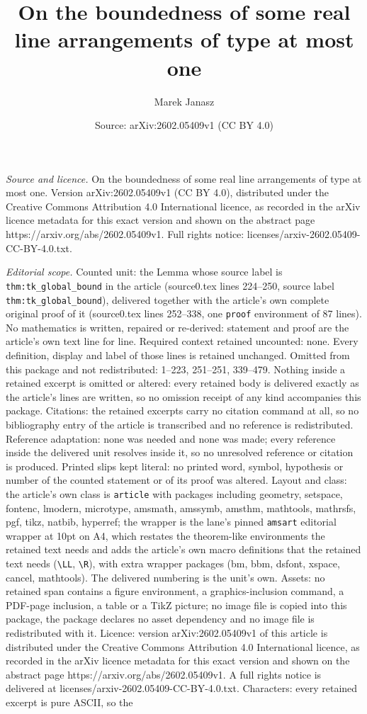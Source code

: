 \documentclass[10pt,a4paper]{amsart}
\title[On the boundedness of some real line arrangements of type at]{On the boundedness of some real line arrangements of type at most one}
\author{Marek Janasz}
\date{Source: arXiv:2602.05409v1 (CC BY 4.0)}
\begin{document}
\maketitle

\noindent\emph{Source and licence.} On the boundedness of some real line arrangements of type at most one. Version arXiv:2602.05409v1 (CC BY 4.0), distributed under the Creative Commons Attribution 4.0 International licence, as recorded in the arXiv licence metadata for this exact version and shown on the abstract page https://arxiv.org/abs/2602.05409v1. Full rights notice: licenses/arxiv-2602.05409-CC-BY-4.0.txt.\par\smallskip

\noindent\textit{Editorial scope.} Counted unit: the Lemma whose source label is \texttt{thm:tk\_global\_bound} in the article (source0.tex lines 224--250, source label \texttt{thm:tk\_global\_bound}), delivered together with the article's own complete original proof of it (source0.tex lines 252--338, one \texttt{proof} environment of 87 lines). No mathematics is written, repaired or re-derived: statement and proof are the article's own text line for line. Required context retained uncounted: none. Every definition, display and label of those lines is retained unchanged. Omitted from this package and not redistributed: 1--223, 251--251, 339--479. Nothing inside a retained excerpt is omitted or altered: every retained body is delivered exactly as the article's lines are written, so no omission receipt of any kind accompanies this package. Citations: the retained excerpts carry no citation command at all, so no bibliography entry of the article is transcribed and no reference is redistributed. Reference adaptation: none was needed and none was made; every reference inside the delivered unit resolves inside it, so no unresolved reference or citation is produced. Printed slips kept literal: no printed word, symbol, hypothesis or number of the counted statement or of its proof was altered. Layout and class: the article's own class is \texttt{article} with packages including geometry, setspace, fontenc, lmodern, microtype, amsmath, amssymb, amsthm, mathtools, mathrsfs, pgf, tikz, natbib, hyperref; the wrapper is the lane's pinned \texttt{amsart} editorial wrapper at 10pt on A4, which restates the theorem-like environments the retained text needs and adds the article's own macro definitions that the retained text needs (\texttt{\textbackslash LL}, \texttt{\textbackslash R}), with extra wrapper packages (bm, bbm, dsfont, xspace, cancel, mathtools). The delivered numbering is the unit's own. Assets: no retained span contains a figure environment, a graphics-inclusion command, a PDF-page inclusion, a table or a TikZ picture; no image file is copied into this package, the package declares no asset dependency and no image file is redistributed with it. Licence: version arXiv:2602.05409v1 of this article is distributed under the Creative Commons Attribution 4.0 International licence, as recorded in the arXiv licence metadata for this exact version and shown on the abstract page https://arxiv.org/abs/2602.05409v1. A full rights notice is delivered at licenses/arxiv-2602.05409-CC-BY-4.0.txt. Characters: every retained excerpt is pure ASCII, so the 
\end{document}
